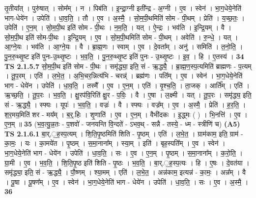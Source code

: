 \documentclass[17pt]{extarticle}
\begin{document}
                  तृ॒तीया᳚त् । पुरु॑षात् । सोम᳚म् । न । पिब॑ति । इ॒न्द्रा॒ग्नी इती᳚न्द्र - अ॒ग्नी । ए॒व । स्वेन॑ । भा॒ग॒धेये॒नेति॑ भाग-धेये॑न । उपेति॑ । धा॒व॒ति॒ । तौ । ए॒व । अ॒स्मै॒ । सो॒म॒पी॒थमिति॑ सोम - पी॒थम् । प्रेति॑ । य॒च्छ॒तः॒ । उपेति॑ । ए॒न॒म् । सो॒म॒पी॒थ इति॑ सोम - पी॒थः । न॒म॒ति॒ । यत् । ऐ॒न्द्रः । भव॑ति । इ॒न्द्रि॒यम् । वै । सो॒म॒पी॒थ इति॑ सोम-पी॒थः । इ॒न्द्रि॒यम् । ए॒व । सो॒म॒पी॒थमिति॑ सोम - पी॒थम् । अवेति॑ । रु॒न्धे॒ । यत् । आ॒ग्ने॒यः । भव॑ति । आ॒ग्ने॒यः । वै । ब्रा॒ह्म॒णः । स्वाम् । ए॒व । दे॒वता᳚म् । अनु॑ । समिति॑ । त॒नो॒ति॒ । पु॒न॒रु॒थ्सृ॒ष्ट इति॑ पुनः-उ॒थ्सृ॒ष्टः । भ॒व॒ति॒ । पु॒न॒रु॒थ्सृ॒ष्ट इति॑ पुनः - उ॒थ्सृ॒ष्टः । इ॒व॒ । हि । ए॒तस्य॑ । \textbf{  34} \newline
                  \newline
                                \textbf{ TS 2.1.5.7} \newline
                  सो॒म॒पी॒थ इति॑ सोम - पी॒थः । समृ॑द्ध्या॒ इति॒ सं - ऋ॒द्ध्यै॒ । ब्रा॒ह्म॒ण॒स्प॒त्यमिति॑ ब्राह्मणः - प॒त्यम् । तू॒प॒रम् । एति॑ । ल॒भे॒त॒ । अ॒भि॒चर॒न्नित्य॑भि - चरन्न्॑ । ब्रह्म॑णः । पति᳚म् । ए॒व । स्वेन॑ । भा॒ग॒धेये॒नेति॑ भाग - धेये॑न । उपेति॑ । धा॒व॒ति॒ । तस्मै᳚ । ए॒व । ए॒न॒म् । एति॑ । वृ॒श्च॒ति॒ । ता॒जक् । आर्ति᳚म् । एति॑ । ऋ॒च्छ॒ति॒ । तू॒प॒रः । भ॒व॒ति॒ । क्षु॒रप॑वि॒रिति॑ क्षु॒र - प॒विः॒ । वै । ए॒षा । ल॒क्ष्मी । यत् । तू॒प॒रः । समृ॑द्ध्य॒ इति॒ सं - ऋ॒द्ध्यै॒ । स्फ्यः । यूपः॑ । भ॒व॒ति॒ । वज्रः॑ । वै । स्फ्यः । वज्र᳚म् । ए॒व । अ॒स्मै॒ । प्रेति॑ । ह॒र॒ति॒ । श॒र॒मय॒मिति॑ शर - मय᳚म् । ब॒र्॒.हिः । शृ॒णाति॑ । ए॒व । ए॒न॒म् । वैभी॑दकः । इ॒द्ध्मः ( ) । भि॒नत्ति॑ । ए॒व । ए॒न॒म् ॥ \textbf{  35} \newline
                  \newline
                      (भ॒व॒त्यु॒न्न॒तः - प॒शवो॑ - जनयन्ति वि॒न्दते॑ - ऽभव॒थ् - सन्नै - तस्ये॒ - ध्म - स्त्रीणि॑ च)  \textbf{(A5)} \newline \newline
                                \textbf{ TS 2.1.6.1} \newline
                  बा॒र्.॒ह॒स्प॒त्यम् । शि॒ति॒पृ॒ष्ठमिति॑ शिति - पृ॒ष्ठम् । एति॑ । ल॒भे॒त॒ । ग्राम॑काम॒ इति॒ ग्राम॑ - का॒मः॒ । यः । का॒मये॑त । पृ॒ष्ठम् । स॒मा॒नाना᳚म् । स्या॒म् । इति॑ । बृह॒स्पति᳚म् । ए॒व । स्वेन॑ । भा॒ग॒धेये॒नेति॑ भाग - धेये॑न । उपेति॑ । धा॒व॒ति॒ । सः । ए॒व । ए॒न॒म् । पृ॒ष्ठम् । स॒मा॒नाना᳚म् । क॒रो॒ति॒ । ग्रा॒मी । ए॒व । भ॒व॒ति॒ । शि॒ति॒पृ॒ष्ठ इति॑ शिति - पृ॒ष्ठः । भ॒व॒ति॒ । बा॒र्.॒ह॒स्प॒त्यः । हि । ए॒षः । दे॒वत॑या । समृ॑द्ध्या॒ इति॒ सं - ऋ॒द्ध्यै॒ । पौ॒ष्णम् । श्या॒मम् । एति॑ । ल॒भे॒त॒ । अन्न॑काम॒ इत्यन्न॑ - का॒मः॒ । अन्न᳚म् । वै । पू॒षा । पू॒षण᳚म् । ए॒व । स्वेन॑ । भा॒ग॒धेये॒नेति॑ भाग - धेये॑न । उपेति॑ । धा॒व॒ति॒ । सः । ए॒व । अ॒स्मै॒ । \textbf{  36} \newline
\end{document}
